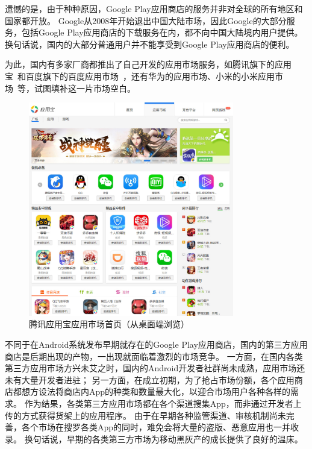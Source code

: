 遗憾的是，由于种种原因，Google Play应用商店的服务并非对全球的所有地区和国家都开放。
Google从2008年开始退出中国大陆市场，因此Google的大部分服务，包括Google Play应用商店的下载服务在内，都不向中国大陆境内用户提供。
换句话说，国内的大部分普通用户并不能享受到Google Play应用商店的便利。

为此，国内有多家厂商都推出了自己开发的应用市场服务，如腾讯旗下的应用宝~\cite{Myapp}和百度旗下的百度应用市场~\cite{Baiduappstore}，还有华为的应用市场、小米的小米应用市场~\cite{Xiaomiappstore}等，试图填补这一片市场空白。

\begin{figure}[h]
	\centering
	\includegraphics[width=0.8\textwidth]{./Figures/edwin-yyb.jpg}
	\caption{腾讯应用宝应用市场首页（从桌面端浏览）}
	\label{fig:mkt-yyb}
	\vspace{-5mm}
\end{figure}

不同于在Android系统发布早期就存在的Google Play应用商店，国内的第三方应用商店是后期出现的产物，一出现就面临着激烈的市场竞争。
一方面，在国内各类第三方应用市场方兴未艾之时，国内的Android开发者社群尚未成熟，应用市场还未有大量开发者进驻；
另一方面，在成立初期，为了抢占市场份额，各个应用商店都想方设法将商店内App的种类和数量最大化，以迎合市场用户各种各样的需求。
作为结果，各类第三方应用市场都在各个渠道搜集App，而非通过开发者上传的方式获得货架上的应用程序。
由于在早期各种监管渠道、审核机制尚未完善，各个市场在搜罗各类App的同时，难免会将大量的盗版、恶意应用也一并收录。
换句话说，早期的各类第三方市场为移动黑灰产的成长提供了良好的温床。

